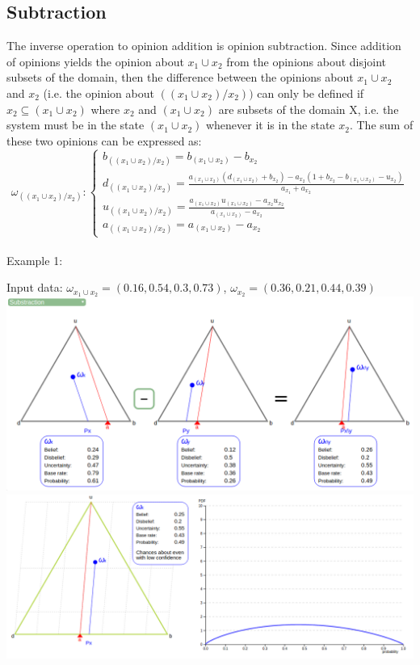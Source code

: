 \documentclass[UTF8]{article}
\newcommand{\opinion}[5]{$\omega_{#1} = (#2, #3, #4, #5)$}
\begin{document}
\subsection{Subtraction}
The inverse operation to opinion addition is opinion subtraction. Since addition
of opinions yields the opinion about $x_1 \cup x_2$ from the opinions about disjoint subsets
of the domain, then the difference between the opinions about $x_1 \cup x_2$ and $x_2$ (i.e.
the opinion about $((x_1 \cup x_2)/x_2))$ can only be defined if $x_2 \subseteq (x_1 \cup x_2)$ where $x_2$ and
$(x_1 \cup x_2)$ are subsets of the domain X, i.e. the system must be in the state $(x_1 \cup x_2)$
whenever it is in the state $x_2$. The sum of these two opinions can be expressed as:
$$
\omega_{((x_1 \cup x_2)/x_2)}: 
\begin{cases}
    b_{((x_1 \cup x_2)/x_2)} = b_{(x_1 \cup x_2)} - b_{x_2}\\    
    d_{((x_1 \cup x_2)/x_2)} = \frac{a_{(x_1 \cup x_2)}(d_{(x_1 \cup x_2)} + b_{x_2}) - a_{x_2}(1 + b_{x_2} - b_{(x_1 \cup x_2)} - u_{x_2})}{a_{x_1} + a_{x_2}}\\
    u_{((x_1 \cup x_2)/x_2)} = \frac{a_{(x_1 \cup x_2)} u_{(x_1 \cup x_2)} - a_{x_2} u_{x_2}}{a_{(x_1 \cup x_2)} - a_{x_2}}\\
    a_{((x_1 \cup x_2)/x_2)} = a_{(x_1 \cup x_2)} - a_{x_2}
\end{cases}
$$\\
Example 1:\\
\begin{center}
    Input data: 
    \opinion{x_1 \cup x_2}{0.16}{0.54}{0.3}{0.73}, 
    \opinion{x_2}{0.36}{0.21}{0.44}{0.39}\\
    \includegraphics[width=6in]{images/sub1.png}
    \includegraphics[width=6in]{images/sub1viz.png}
\end{center}
\end{document}
